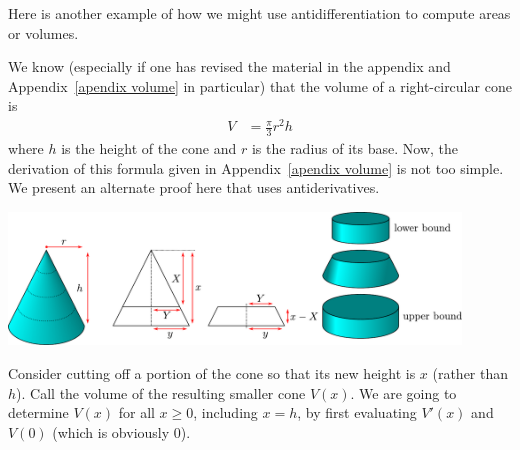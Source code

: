 Here is another example of how we might use antidifferentiation to compute
areas or volumes.
\begin{eg}\label{eg vol cone}
We know (especially if one has revised the material in the appendix and
Appendix~\ref{apendix volume} in particular) that the volume of a
right-circular cone is
\begin{align*}
  V &= \frac{\pi}{3} r^2h
\end{align*}
where $h$ is the height of the cone and $r$ is the radius of its base. Now, the
derivation of this formula given in Appendix~\ref{apendix volume} is not too
simple. We present an alternate proof here that uses antiderivatives.

\begin{wfig}
 \begin{center}
  \includegraphics[width=0.9\textwidth]{extra/cones}
 \end{center}
\end{wfig}

Consider cutting off a portion of the cone so that its new height is $x$
(rather than $h$). Call the volume of the resulting smaller cone $V(x)$. We are
going to determine $V(x)$ for all $x\ge 0$, including $x=h$, by first evaluating
$V'(x)$ and $V(0)$ (which is obviously $0$).


\end{eg}
